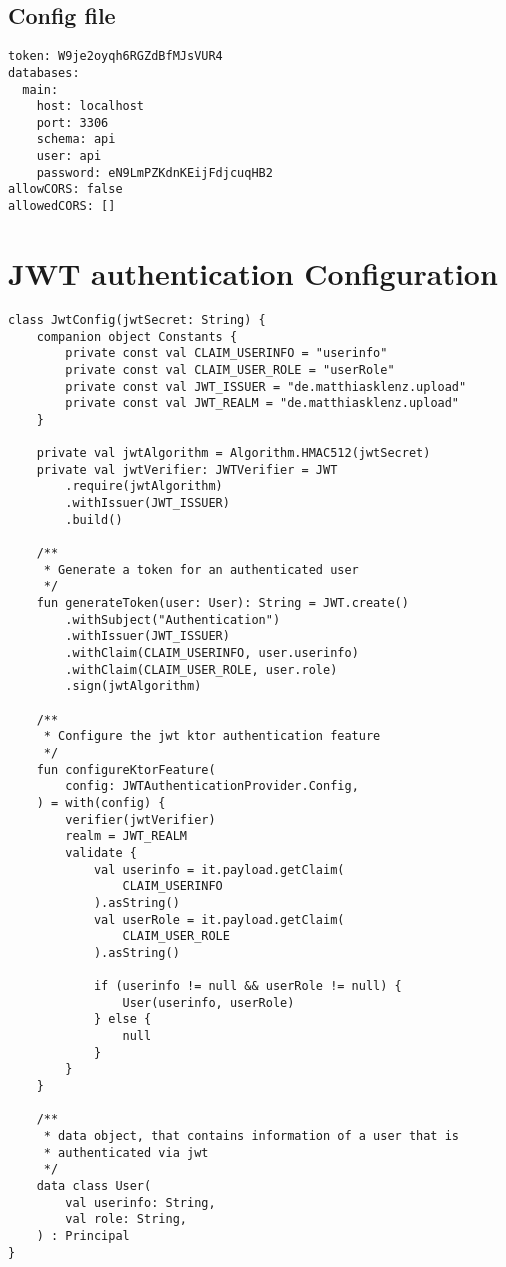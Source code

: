 \subsection{Config file}

\begin{verbatim}
token: W9je2oyqh6RGZdBfMJsVUR4
databases:
  main:
    host: localhost
    port: 3306
    schema: api
    user: api
    password: eN9LmPZKdnKEijFdjcuqHB2
allowCORS: false
allowedCORS: []
\end{verbatim}
\label{code:App_conf_yml}

\section{JWT authentication Configuration}

\begin{verbatim}
class JwtConfig(jwtSecret: String) {
    companion object Constants {
        private const val CLAIM_USERINFO = "userinfo"
        private const val CLAIM_USER_ROLE = "userRole"
        private const val JWT_ISSUER = "de.matthiasklenz.upload"
        private const val JWT_REALM = "de.matthiasklenz.upload"
    }

    private val jwtAlgorithm = Algorithm.HMAC512(jwtSecret)
    private val jwtVerifier: JWTVerifier = JWT
        .require(jwtAlgorithm)
        .withIssuer(JWT_ISSUER)
        .build()

    /**
     * Generate a token for an authenticated user
     */
    fun generateToken(user: User): String = JWT.create()
        .withSubject("Authentication")
        .withIssuer(JWT_ISSUER)
        .withClaim(CLAIM_USERINFO, user.userinfo)
        .withClaim(CLAIM_USER_ROLE, user.role)
        .sign(jwtAlgorithm)

    /**
     * Configure the jwt ktor authentication feature
     */
    fun configureKtorFeature(
        config: JWTAuthenticationProvider.Config,
    ) = with(config) {
        verifier(jwtVerifier)
        realm = JWT_REALM
        validate {
            val userinfo = it.payload.getClaim(
                CLAIM_USERINFO
            ).asString()
            val userRole = it.payload.getClaim(
                CLAIM_USER_ROLE
            ).asString()

            if (userinfo != null && userRole != null) {
                User(userinfo, userRole)
            } else {
                null
            }
        }
    }

    /**
     * data object, that contains information of a user that is 
     * authenticated via jwt
     */
    data class User(
        val userinfo: String,
        val role: String,
    ) : Principal
}
\end{verbatim}
\label{code:JWT_conf}

